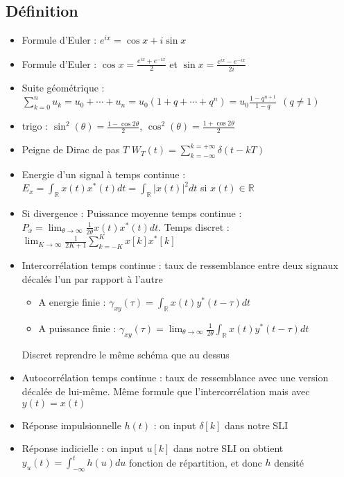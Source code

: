 \documentclass{article}
\begin{document}
\small   
\begin{multicols}{2}
    \section{Définition}
    \begin{itemize}
        \item Formule d'Euler : $ e^{ix} = \cos x + i \sin x $ 
        \item Formule d'Euler : $ \cos x = \frac{e^{ix} + e^{-ix}}{2} $ et $ \sin x = \frac{e^{ix} - e^{-ix}}{2i} $
        \item Suite géométrique : $ \sum _{k=0}^{n}u_{k}=u_{0}+\cdots +u_{n}=u_{0}(1+q+\cdots +q^{n})=u_{0}{\frac {1-q^{n+1}}{1-q}}\ \ (q\neq 1) $
        \item trigo : $ \sin ^2(\theta ) = \frac{1 - \cos 2 \theta }{2}$, $ \cos ^2(\theta ) = \frac{1 + \cos 2 \theta}{2} $ 
        \item Peigne de Dirac de pas $ T $ $ W_T(t) = \sum_{k=-\infty }^{k=+\infty } \delta (t - kT) $
        \item Energie d'un signal à temps continue : $ E_x = \int_{\mathbb{R}}^{} x(t) x^*(t)dt = \int_{\mathbb{R}}^{} \left| x(t) \right| ^2 dt$ si $ x(t) \in \mathbb{R} $ 
        \item Si divergence : Puissance moyenne temps continue : $ P_x = \lim_{\theta  \to \infty} \frac{1}{2 \theta } x(t) x^*(t)dt $. Temps discret : $ \lim_{K \to \infty} \frac{1}{2K+1}\sum_{k=-K}^{K}x[k]x^*[k] $ 
        \item Intercorrélation temps continue : taux de ressemblance entre deux signaux décalés l'un par rapport à l'autre \begin{itemize}
            \item A energie finie : $ \gamma _{xy}(\tau ) = \int_{\mathbb{R}}^{}x(t) y^*(t - \tau ) dt$ 
            \item A puissance finie : $ \gamma _{xy}(\tau ) = \lim_{\theta  \to \infty} \frac{1}{2 \theta } \int_{\mathbb{R}}^{}x(t) y^*(t - \tau ) dt$ 
        \end{itemize} Discret reprendre le même schéma que au dessus
        \item Autocorrélation temps continue : taux de ressemblance avec une version décalée de lui-même. Même formule que l'intercorrélation mais avec $ y(t) = x(t) $ 
        \item Réponse impulsionnelle $ h(t) $ : on input $ \delta [k] $ dans notre SLI
        \item Réponse indicielle : on input $ u [k] $ dans notre SLI on obtient $ y_u(t) = \int_{-\infty }^{t}h(u)du $ fonction de répartition, et donc $ h $ densité

\end{itemize}
\end{multicols}
\end{document}

